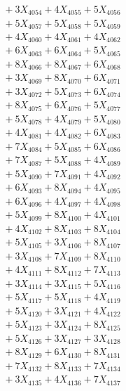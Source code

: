 \documentclass[a4paper,10pt]{article}
\begin{document}
{\begin{align}
&\;  + 3 X_{4054} + 4 X_{4055} + 5 X_{4056} \\[0.3ex]
&\;  + 5 X_{4057} + 5 X_{4058} + 5 X_{4059} \\[0.5ex]\allowbreak
&\;  + 4 X_{4060} + 4 X_{4061} + 4 X_{4062} \\[0.3ex]
&\;  + 6 X_{4063} + 6 X_{4064} + 5 X_{4065} \\[0.3ex]
&\;  + 8 X_{4066} + 8 X_{4067} + 6 X_{4068} \\[0.3ex]
&\;  + 3 X_{4069} + 8 X_{4070} + 6 X_{4071} \\[0.3ex]
&\;  + 3 X_{4072} + 5 X_{4073} + 6 X_{4074} \\[0.3ex]
&\;  + 8 X_{4075} + 6 X_{4076} + 5 X_{4077} \\[0.3ex]
&\;  + 5 X_{4078} + 4 X_{4079} + 5 X_{4080} \\[0.3ex]
&\;  + 4 X_{4081} + 4 X_{4082} + 6 X_{4083} \\[0.3ex]
&\;  + 7 X_{4084} + 5 X_{4085} + 6 X_{4086} \\[0.3ex]
&\;  + 7 X_{4087} + 5 X_{4088} + 4 X_{4089} \\[0.5ex]\allowbreak
&\;  + 5 X_{4090} + 7 X_{4091} + 4 X_{4092} \\[0.3ex]
&\;  + 6 X_{4093} + 8 X_{4094} + 4 X_{4095} \\[0.3ex]
&\;  + 6 X_{4096} + 4 X_{4097} + 4 X_{4098} \\[0.3ex]
&\;  + 5 X_{4099} + 8 X_{4100} + 4 X_{4101} \\[0.3ex]
&\;  + 4 X_{4102} + 8 X_{4103} + 8 X_{4104} \\[0.3ex]
&\;  + 5 X_{4105} + 3 X_{4106} + 8 X_{4107} \\[0.3ex]
&\;  + 3 X_{4108} + 7 X_{4109} + 8 X_{4110} \\[0.3ex]
&\;  + 4 X_{4111} + 8 X_{4112} + 7 X_{4113} \\[0.3ex]
&\;  + 3 X_{4114} + 3 X_{4115} + 5 X_{4116} \\[0.3ex]
&\;  + 5 X_{4117} + 5 X_{4118} + 4 X_{4119} \\[0.5ex]\allowbreak
&\;  + 5 X_{4120} + 3 X_{4121} + 4 X_{4122} \\[0.3ex]
&\;  + 5 X_{4123} + 3 X_{4124} + 8 X_{4125} \\[0.3ex]
&\;  + 5 X_{4126} + 3 X_{4127} + 3 X_{4128} \\[0.3ex]
&\;  + 8 X_{4129} + 6 X_{4130} + 8 X_{4131} \\[0.3ex]
&\;  + 7 X_{4132} + 8 X_{4133} + 7 X_{4134} \\[0.3ex]
&\;  + 3 X_{4135} + 4 X_{4136} + 7 X_{4137} \\[0.3ex]

\end{align}}
\end{document}
